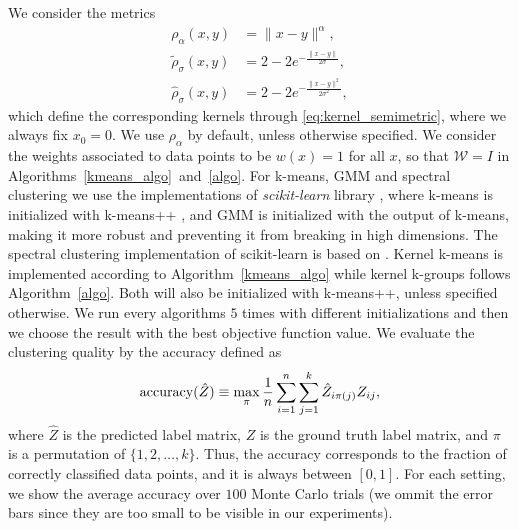\documentclass[10pt,journal,compsoc]{IEEEtran}
\newcommand\kk{K}
\newcommand\W{{\mathcal{W}}}
\begin{document}
We consider
the metrics
\begin{align}
\rho_{\alpha}(x,y) &= \| x-y \|^{\alpha}, 
\label{eq:rho_alpha} \\
%
\widetilde{\rho}_{\sigma}(x,y) &= 2 - 2 e^{-\tfrac{\|x-y\|}{2 \sigma}},  
\label{eq:rho_tilde}\\
%
\widehat{\rho}_{\sigma}(x,y) &= 2 - 2 e^{-\tfrac{\|x-y\|^2}{2 \sigma^2}},
\label{eq:rho_hat}
\end{align}
which define the 
corresponding kernels through 
\eqref{eq:kernel_semimetric}, where we always fix $x_0=0$.
We use $\rho_\alpha$ by default, unless otherwise specified.
We consider the weights associated to data points to be $w(x) = 1$ for
all $x$, so that $\W = I$ in 
Algorithms~\ref{kmeans_algo}~and~\ref{algo}.
For k-means, GMM and spectral clustering we use the
implementations of \emph{scikit-learn} library \cite{scikit-learn}, where  
k-means is initialized with 
k-means++ \cite{Vassilvitskii}, 
and GMM is initialized with the output of k-means, making 
it more robust and preventing
it from breaking in high dimensions. 
The spectral clustering implementation of scikit-learn 
is based on \cite{Malik}. 
Kernel k-means is implemented according to Algorithm~\ref{kmeans_algo} while
kernel k-groups follows Algorithm~\ref{algo}.
Both will also be initialized with k-means++, unless specified otherwise.
We run every algorithms $5$ times with different initializations and then
we choose the result with the best objective function value. 
We evaluate the clustering quality by
the accuracy defined as
\begin{equation}
\label{eq:accuracy}
\textnormal{accuracy}(\hat{Z}) \equiv \max_\pi
\dfrac{1}{n}\sum_{i=1}^n\sum_{j=1}^k \hat{Z}_{i \pi(j)} Z_{ij} ,
\end{equation}
where $\hat{Z}$ is the predicted label matrix, $Z$
is the ground truth label matrix, 
and $\pi$ is a permutation of $\{1,2,\dotsc,k\}$. 
Thus, the accuracy corresponds to the fraction
of correctly classified data points, and it is always between $[0,1]$.
For each setting, we show the average accuracy over $100$ Monte
Carlo trials (we ommit the error bars since they are too small to be
visible in our experiments).
\end{document}
